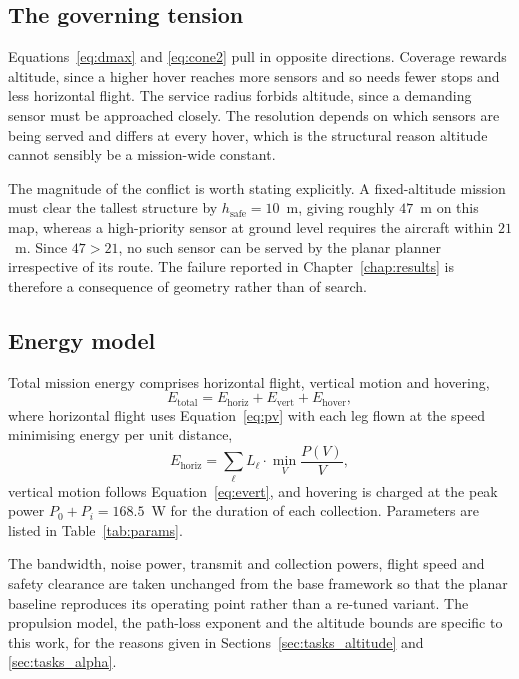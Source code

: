 \subsection{The governing tension}
\label{sec:tension}

Equations~\eqref{eq:dmax} and \eqref{eq:cone2} pull in opposite directions. Coverage rewards altitude, since a higher hover reaches more sensors and so needs fewer stops and less horizontal flight. The service radius forbids altitude, since a demanding sensor must be approached closely. The resolution depends on which sensors are being served and differs at every hover, which is the structural reason altitude cannot sensibly be a mission-wide constant.

The magnitude of the conflict is worth stating explicitly. A fixed-altitude mission must clear the tallest structure by $h_{\mathrm{safe}} = 10$~m, giving roughly $47$~m on this map, whereas a high-priority sensor at ground level requires the aircraft within $21$~m. Since $47 > 21$, no such sensor can be served by the planar planner irrespective of its route. The failure reported in Chapter~\ref{chap:results} is therefore a consequence of geometry rather than of search.

\subsection{Energy model}

Total mission energy comprises horizontal flight, vertical motion and hovering,
\begin{equation}
E_{\mathrm{total}} = E_{\mathrm{horiz}} + E_{\mathrm{vert}} + E_{\mathrm{hover}} ,
\label{eq:etotal}
\end{equation}
where horizontal flight uses Equation~\eqref{eq:pv} with each leg flown at the speed minimising energy per unit distance,
\begin{equation}
E_{\mathrm{horiz}} = \sum_{\ell} L_{\ell} \cdot \min_{V} \frac{P(V)}{V} ,
\end{equation}
vertical motion follows Equation~\eqref{eq:evert}, and hovering is charged at the peak power $P_0 + P_i = 168.5$~W for the duration of each collection. Parameters are listed in Table~\ref{tab:params}.

The bandwidth, noise power, transmit and collection powers, flight speed and safety clearance are taken unchanged from the base framework \cite{paperA} so that the planar baseline reproduces its operating point rather than a re-tuned variant. The propulsion model, the path-loss exponent and the altitude bounds are specific to this work, for the reasons given in Sections~\ref{sec:tasks_altitude} and \ref{sec:tasks_alpha}.

